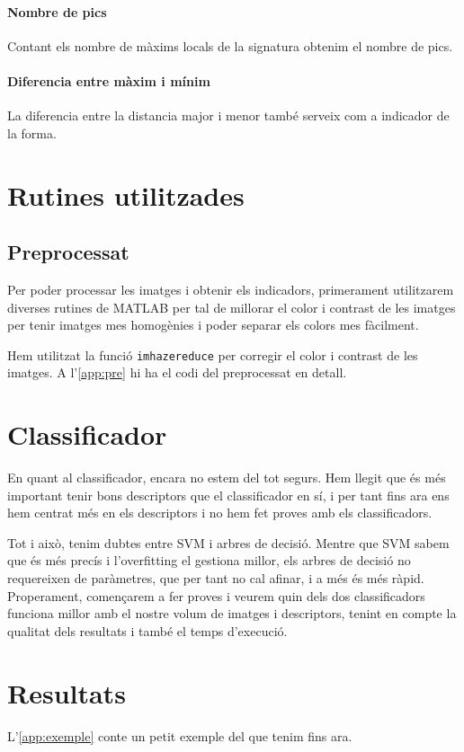 \paragraph{Nombre de pics} Contant els nombre de màxims locals de la signatura obtenim el nombre de pics.

\paragraph{Diferencia entre màxim i mínim} La diferencia entre la distancia major i menor també serveix com a indicador de la forma.

\section{Rutines utilitzades}

\subsection{Preprocessat}

Per poder processar les imatges i obtenir els indicadors, primerament utilitzarem 
diverses rutines de MATLAB per tal de millorar el color i contrast de les imatges per tenir
imatges mes homogènies i poder separar els colors mes fàcilment.

Hem utilitzat la funció \texttt{imhazereduce} per corregir el color i contrast de les imatges.
A l'\cref{app:pre} hi ha el codi del preprocessat en detall.




\section{Classificador}%
\label{sec:classificador}

En quant al classificador, encara no estem del tot segurs. Hem llegit que és més
important tenir bons descriptors que el classificador en sí, i per tant fins
ara ens hem centrat més en els descriptors i no hem fet proves amb els 
classificadors. 

Tot i això, tenim dubtes entre SVM i arbres de decisió. Mentre que SVM sabem que és més precís i l'overfitting el gestiona millor, els arbres de decisió no
requereixen de paràmetres, que per tant no cal afinar, i a més és més ràpid.
Properament, començarem a fer proves i veurem quin dels dos classificadors
funciona millor amb el nostre volum de imatges i descriptors, tenint en compte
la qualitat dels resultats i també el temps d'execució.

\section{Resultats}%
\label{sec:resultats}

L'\cref{app:exemple} conte un petit exemple del que tenim fins ara.